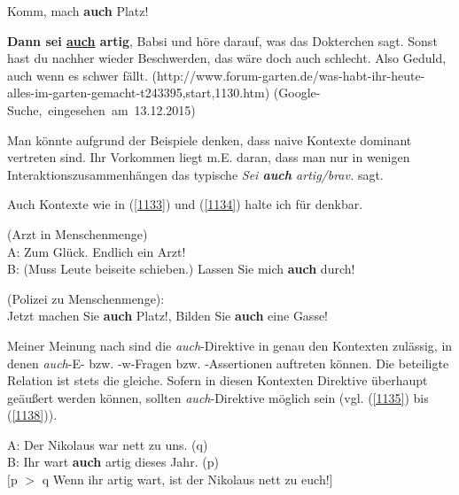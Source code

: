 {\begin{exe}
	\ex\label{1131} 
	Komm, mach \textbf{auch} Platz!
\end{exe}	
\vspace{-0.5cm}	
\begin{exe}
	\ex\label{1132} 
	\scriptsize
 	\textbf{Dann sei \underline{auch} artig}, Babsi und höre darauf, was das Dokterchen sagt. Sonst hast du nachher wieder Beschwerden, das wäre doch auch 		schlecht. Also Geduld, auch wenn es schwer fällt.
	\newline
	\hbox{}\hfill\hbox{(http://www.forum-garten.de/was-habt-ihr-heute-}
	\newline
	\hbox{}\hfill\hbox{alles-im-garten-gemacht-t243395,start,1130.htm)}
	\newline
	\hbox{}\hfill\hbox{(Google-Suche, eingesehen am 13.12.2015)}
\end{exe}
Man könnte aufgrund der Beispiele denken, dass naive Kontexte dominant vertreten sind. Ihr Vorkommen liegt m.E. daran, dass man nur in wenigen Interaktions\-zusammenhängen das typische \textit{Sei \textbf{auch} artig/brav.} sagt.

Auch Kontexte wie in (\ref{1133}) und (\ref{1134}) halte ich für denkbar.

\begin{exe}
	\ex\label{1133} 
	(Arzt in Menschenmenge)\\
	A: Zum Glück. Endlich ein Arzt!\\
	B: (Muss Leute beiseite schieben.) Lassen Sie mich \textbf{auch} durch! 
\end{exe}

\begin{exe}
	\ex\label{1134} 
	(Polizei zu Menschenmenge):\\
	Jetzt machen Sie \textbf{auch} Platz!, Bilden Sie \textbf{auch} eine Gasse!
\end{exe}	
Meiner Meinung nach sind die \textit{auch}-Direktive in genau den Kontexten zulässig, in denen \textit{auch}-E- bzw. -w-Fragen bzw. -Assertionen auftreten können. Die beteiligte Relation ist stets die gleiche. Sofern in diesen Kontexten Direktive überhaupt geäußert werden können, sollten \textit{auch}-Direktive möglich sein (vgl. (\ref{1135}) bis (\ref{1138})).
								
\begin{exe}
	\ex\label{1135} 
	A: Der Nikolaus war nett zu uns. (q)\\
	B: Ihr wart \textbf{auch} artig dieses Jahr. (p)\\
	$[$p $>$ q \glq Wenn ihr artig wart, ist der Nikolaus nett zu euch!\grq {}$]$
\end{exe}	

}
